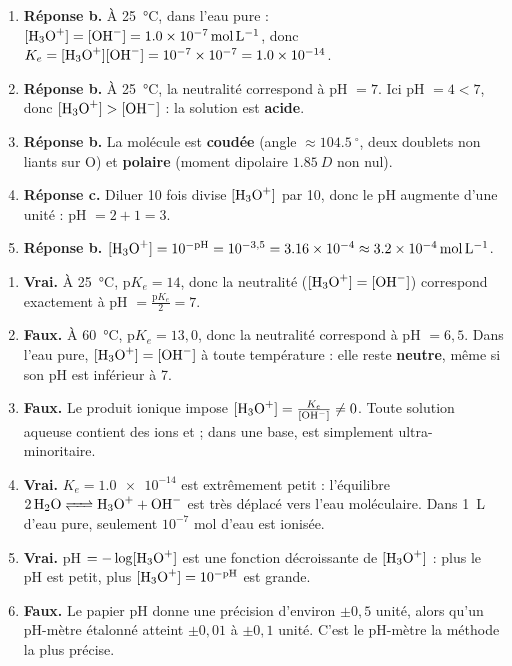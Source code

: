 \documentclass[11pt]{article}
\providecommand{\degree}{^{\circ}}
\begin{document}
\begin{corrige}
\begin{enumerate}
    \item \textbf{Réponse b.} À \SI{25}{\celsius}, dans l'eau pure : $[\ce{H3O+}] = [\ce{OH-}] = \SI{1,0e-7}{mol.L^{-1}}$, donc $K_e = [\ce{H3O+}][\ce{OH-}] = 10^{-7} \times 10^{-7} = \num{1,0e-14}$.
    \item \textbf{Réponse b.} À \SI{25}{\celsius}, la neutralité correspond à pH $= 7$. Ici pH $= 4 < 7$, donc $[\ce{H3O+}] > [\ce{OH-}]$ : la solution est \textbf{acide}.
    \item \textbf{Réponse b.} La molécule  est \textbf{coudée} (angle $\approx \SI{104,5}{\degree}$, deux doublets non liants sur O) et \textbf{polaire} (moment dipolaire $\SI{1,85}{D}$ non nul).
    \item \textbf{Réponse c.} Diluer 10 fois divise $[\ce{H3O+}]$ par 10, donc le pH augmente d'une unité : pH $= 2 + 1 = 3$.
    \item \textbf{Réponse b.} $[\ce{H3O+}] = 10^{-\text{pH}} = 10^{-3,5} = \num{3,16e-4} \approx \SI{3,2e-4}{mol.L^{-1}}$.
\end{enumerate}
\end{corrige}

\begin{corrige}
\begin{enumerate}
    \item \textbf{Vrai.} À \SI{25}{\celsius}, p$K_e = 14$, donc la neutralité ($[\ce{H3O+}] = [\ce{OH-}]$) correspond exactement à pH $= \frac{\text{p}K_e}{2} = 7$.
    \item \textbf{Faux.} À \SI{60}{\celsius}, p$K_e = 13{,}0$, donc la neutralité correspond à pH $= 6{,}5$. Dans l'eau pure, $[\ce{H3O+}] = [\ce{OH-}]$ à toute température : elle reste \textbf{neutre}, même si son pH est inférieur à 7.
    \item \textbf{Faux.} Le produit ionique impose $[\ce{H3O+}] = \frac{K_e}{[\ce{OH-}]} \neq 0$. Toute solution aqueuse contient des ions  et  ; dans une base,  est simplement ultra-minoritaire.
    \item \textbf{Vrai.} $K_e = \num{1,0e-14}$ est extrêmement petit : l'équilibre $\ce{2 H2O <=> H3O+ + OH-}$ est très déplacé vers l'eau moléculaire. Dans \SI{1}{L} d'eau pure, seulement $10^{-7}$ mol d'eau est ionisée.
    \item \textbf{Vrai.} pH $= -\log[\ce{H3O+}]$ est une fonction décroissante de $[\ce{H3O+}]$ : plus le pH est petit, plus $[\ce{H3O+}] = 10^{-\text{pH}}$ est grande.
    \item \textbf{Faux.} Le papier pH donne une précision d'environ $\pm 0{,}5$ unité, alors qu'un pH-mètre étalonné atteint $\pm 0{,}01$ à $\pm 0{,}1$ unité. C'est le pH-mètre la méthode la plus précise.
\end{enumerate}
\end{corrige}
\end{document}
